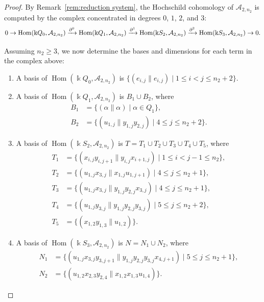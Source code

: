\documentclass[a4paper, reqno, 11pt]{amsart}
\theoremstyle{definition}
\begin{document}
\begin{proof}
	By Remark~\ref{rem:reduction system}, the Hochschild cohomology of $\mathcal A_{2, n_2}$ is computed by the complex concentrated in degrees $0$, $1$, $2$, and $3$:
	\[
	\scalebox{0.95}{$
		0 \to \operatorname{Hom}(\Bbbk Q_0, \mathcal A_{2, n_2}) \xrightarrow{\partial^0} 
		\operatorname{Hom}(\Bbbk Q_1, \mathcal A_{2, n_2}) \xrightarrow{\partial^1} 
		\operatorname{Hom}(\Bbbk S_2, \mathcal A_{2, n_2}) \xrightarrow{\partial^2} 
		\operatorname{Hom}(\Bbbk S_3,\mathcal A_{2, n_2}) \to 0.
		$}
	\]
	
	Assuming $n_2 \ge 3$, we now determine the bases and dimensions for each term in the complex above:
	\begin{enumerate}[label=(\alph*), leftmargin=*, itemindent=0pt, labelindent=0pt, labelsep=0.5em]
		\item A basis of $\operatorname{Hom}(\Bbbk Q_0, \mathcal{A}_{2, n_2})$ is
		\(
		\{(e_{i,j} \parallel e_{i,j}) \mid 1 \le i < j \le n_2+2\}.
		\)
		
		\item A basis of $\operatorname{Hom}(\Bbbk Q_1, \mathcal{A}_{2, n_2})$ is $B_1\cup B_2$, where
		\begin{align*}
			B_1&=\{(\alpha \parallel \alpha) \mid \alpha \in Q_1\},\\
			B_2&=\{(u_{1,j} \parallel y_{1,j}y_{2,j}) \mid 4 \le j \le n_2+2\}.
		\end{align*}
		
		\item A basis of $\operatorname{Hom}(\Bbbk S_2, \mathcal{A}_{2, n_2})$ is $T = T_1 \cup T_2 \cup T_3 \cup T_4 \cup T_5$, where
		\allowdisplaybreaks
		\begin{align*}
			T_1 &= \{(x_{i,j}y_{i,j+1} \parallel y_{i,j}x_{i+1,j}) \mid 1 \le i<j-1 \le n_2\},\\
			T_2 &= \{(u_{1,j}x_{3,j} \parallel x_{1,j}u_{1,j+1}) \mid 4 \le j \le n_2+1\},\\
			T_3 &= \{(u_{1,j}x_{3,j} \parallel y_{1,j}y_{2,j}x_{3,j}) \mid 4 \le j \le n_2+1\},\\
			T_4 &= \{(u_{1,j}y_{3,j} \parallel y_{1,j}y_{2,j}y_{3,j}) \mid 5 \le j \le n_2+2\},\\
			T_5 &= \{(x_{1,2}y_{1,3} \parallel u_{1,2})\}.
		\end{align*}
		
		\item A basis of $\operatorname{Hom}(\Bbbk S_3, \mathcal{A}_{2, n_2})$ is $N = N_1 \cup N_2$, where
		\begin{align*}
			N_1 &= \{(u_{1,j}x_{3,j}y_{3,j+1} \parallel y_{1,j}y_{2,j}y_{3,j}x_{4,j+1}) \mid 5 \le j \le n_2+1\},\\
			N_2 &= \{(u_{1,2}x_{2,3}y_{2,4} \parallel x_{1,2}x_{1,3}u_{1,4})\}.
		\end{align*}
	\end{enumerate}
	

\end{proof}
\end{document}
